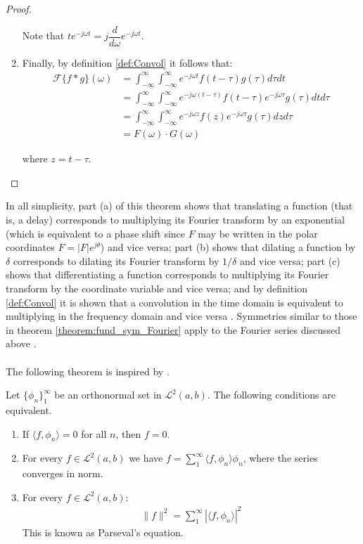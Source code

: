 \begin{proof}
\begin{enumerate}[label=(\alph*)]
Note that $t e^{-j \omega t} = j \dfrac{d}{d\omega} e^{-j\omega t}$.

\item Finally, by definition \ref{def:Convol} it follows that:
\begin{align*}
\mathcal{F}\{f*g\}(\omega) &= \int_{-\infty}^\infty \int_{-\infty}^\infty e^{-j \omega t} f(t - \tau) g(\tau) d\tau dt \\
&= \int_{-\infty}^\infty \int_{-\infty}^\infty e^{-j\omega(t-\tau)} f(t-\tau) e^{-j\omega \tau} g(\tau) dt d\tau \\
&= \int_{-\infty}^\infty \int_{-\infty}^\infty e^{-j\omega z} f(z) e^{-j\omega \tau} g(\tau) dz d\tau \\
&= F(\omega) \cdot G(\omega)
\end{align*}

where $z = t - \tau$.
\end{enumerate}
\end{proof}

\noindent
In all simplicity, part (a) of this theorem shows that translating a function (that is, a delay) corresponds to multiplying its Fourier transform by an exponential (which is equivalent to a phase shift since $F$ may be written in the polar coordinates $F = |F|e^{j\theta}$) and vice versa; part (b) shows that dilating a function by $\delta$ corresponds to dilating its Fourier transform by $1/\delta$ and vice versa; part (c) shows that differentiating a function corresponds to multiplying its Fourier transform by the coordinate variable and vice versa; and by definition \ref{def:Convol} it is shown that a convolution in the time domain is equivalent to multiplying in the frequency domain and vice versa \cite{page 215, FAA}. Symmetries similar to those in theorem \ref{theorem:fund_sym_Fourier} apply to the Fourier series discussed above \cite{page 60, DTSP}.
\\ \\
The following theorem is inspired by \cite{page 77, FAA}. 

\begin{theorem}
Let $\{\phi_n\}_1^\infty$ be an orthonormal set in $\mathcal{L}^2(a,b)$. The following conditions are equivalent.
\begin{enumerate}[label=(\alph*)]
\item If $\langle f, \phi_n \rangle = 0$ for all $n$, then $f = 0$.
\item For every $f \in \mathcal{L}^2(a,b)$ we have $f = \sum_1^\infty \langle f, \phi_n \rangle \phi_n$, where the series converges in norm.\\
\item For every $f \in \mathcal{L}^2(a,b)$:
\begin{align*}
\|f\|^2 = \sum_1^\infty |\langle f,\phi_n \rangle|^2
\end{align*}
This is known as Parseval's equation.
\end{enumerate}
\end{theorem}

